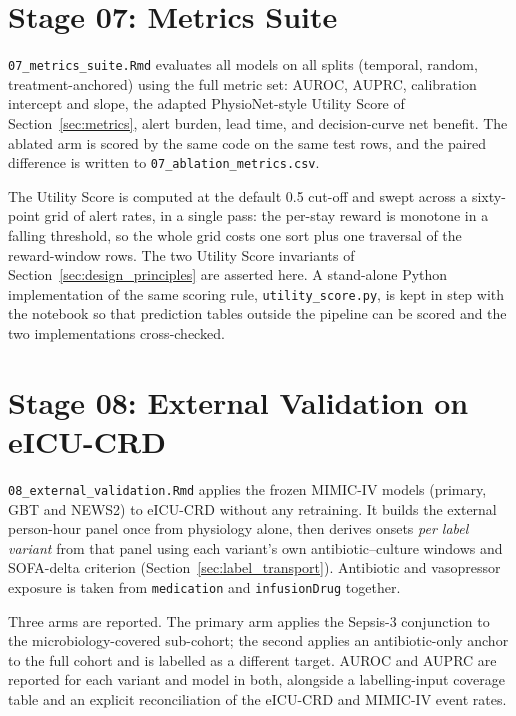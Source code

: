 \section{Stage 07: Metrics Suite}

\texttt{07\_metrics\_suite.Rmd} evaluates all models on all splits (temporal,
random, treatment-anchored) using the full metric set: AUROC, AUPRC, calibration
intercept and slope, the adapted PhysioNet-style Utility Score of
Section~\ref{sec:metrics}, alert burden, lead time, and
decision-curve net benefit. The ablated arm is scored by the same code on the
same test rows, and the paired difference is written to
\texttt{07\_ablation\_metrics.csv}.

The Utility Score is computed at the default 0.5 cut-off and swept across a
sixty-point grid of alert rates, in a single pass: the per-stay reward is
monotone in a falling threshold, so the whole grid costs one sort plus one
traversal of the reward-window rows. The two Utility Score invariants of
Section~\ref{sec:design_principles} are asserted here. A stand-alone Python
implementation of the same scoring rule, \texttt{utility\_score.py}, is kept in
step with the notebook so that prediction tables outside the pipeline can be
scored and the two implementations cross-checked.


\section{Stage 08: External Validation on eICU-CRD}

\texttt{08\_external\_validation.Rmd} applies the frozen MIMIC-IV models
(primary, GBT and NEWS2) to eICU-CRD without any retraining. It builds the
external person-hour panel once from physiology alone, then derives onsets
\emph{per label variant} from that panel using each variant's own
antibiotic--culture windows and SOFA-delta criterion
(Section~\ref{sec:label_transport}). Antibiotic and vasopressor exposure is
taken from \texttt{medication} and \texttt{infusionDrug} together.

Three arms are reported. The primary arm applies the Sepsis-3 conjunction to
the microbiology-covered sub-cohort; the second applies an antibiotic-only
anchor to the full cohort and is labelled as a different target. AUROC and
AUPRC are reported for each variant and model in both, alongside a
labelling-input coverage table and an explicit reconciliation of the eICU-CRD
and MIMIC-IV event rates.

